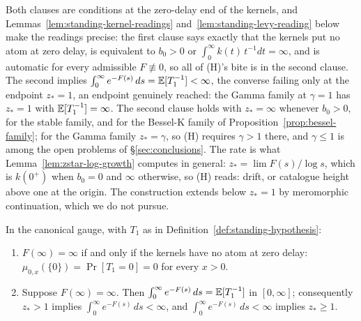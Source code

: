Both clauses are conditions at the zero-delay end of the kernels, and
Lemmas~\ref{lem:standing-kernel-readings} and~\ref{lem:standing-levy-reading} below make the
readings precise: the first clause says exactly that the kernels put no atom at zero delay, is
equivalent to $b_0 > 0$ or $\int_0^\infty k(t)\,t^{-1}dt = \infty$, and is automatic for every
admissible $F \not\equiv 0$, so all of (H)'s bite is in the second clause. The
second implies $\int_0^\infty e^{-F(s)}\,ds = \mathbb{E}[T_1^{-1}] < \infty$, the converse failing
only at the endpoint $z_* = 1$, an endpoint genuinely reached: the Gamma family at
$\gamma = 1$ has $z_* = 1$ with $\mathbb{E}[T_1^{-1}] = \infty$. The second clause holds with
$z_* = \infty$ whenever $b_0 > 0$, for the stable family, and for the Bessel-K family of
Proposition~\ref{prop:bessel-family}; for the Gamma family $z_* = \gamma$, so (H) requires
$\gamma > 1$ there, and $\gamma \le 1$ is among the open problems of
\S\ref{sec:conclusions}. The rate is what Lemma~\ref{lem:zstar-log-growth} computes in general:
$z_* = \lim F(s)/\log s$, which is $k(0^+)$ when $b_0 = 0$ and $\infty$ otherwise, so (H) reads:
drift, or catalogue height above one at the origin. The construction extends below $z_* = 1$ by
meromorphic continuation, which we do not pursue.

\begin{lemma}\label{lem:standing-kernel-readings}
In the canonical gauge, with $T_1$ as in Definition~\ref{def:standing-hypothesis}:
\begin{enumerate}
\item $F(\infty) = \infty$ if and only if the kernels have no atom at zero delay:
$\mu_{0,x}(\{0\}) = \Pr[T_1 = 0] = 0$ for every $x > 0$.
\item Suppose $F(\infty) = \infty$. Then $\int_0^\infty e^{-F(s)}\,ds = \mathbb{E}[T_1^{-1}]$ in
$[0,\infty]$; consequently $z_* > 1$ implies $\int_0^\infty e^{-F(s)}\,ds < \infty$, and
$\int_0^\infty e^{-F(s)}\,ds < \infty$ implies $z_* \ge 1$.
\end{enumerate}
\end{lemma}

